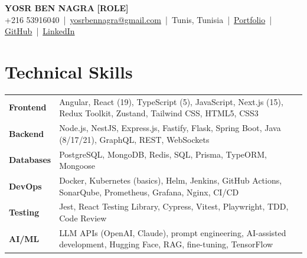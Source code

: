 \documentclass[10pt,a4paper]{article}
\newcommand{\skillrow}[2]{\textbf{#1} & #2 \\}
\begin{document}
{\huge\bfseries YOSR BEN NAGRA} \hfill {\large\color{teal}\bfseries [ROLE]}\\[3pt]
{\small\color{gray}
  +216 53916040 \,|\, \href{mailto:yosrbennagra@gmail.com}{yosrbennagra@gmail.com} \,|\, Tunis, Tunisia \,|\,
  \href{https://portfolio-yosr.vercel.app/en}{Portfolio} \,|\,
  \href{https://github.com/YosrBennagra}{GitHub} \,|\,
  \href{https://www.linkedin.com/in/yosr-ben-nagra/}{LinkedIn}
}

\section*{Technical Skills}
{\small
\begin{tabular}{@{}p{}p{}@{}}
\skillrow{Frontend}{Angular, React (19), TypeScript (5), JavaScript, Next.js (15), Redux Toolkit, Zustand, Tailwind CSS, HTML5, CSS3}
\skillrow{Backend}{Node.js, NestJS, Express.js, Fastify, Flask, Spring Boot, Java (8/17/21), GraphQL, REST, WebSockets}
\skillrow{Databases}{PostgreSQL, MongoDB, Redis, SQL, Prisma, TypeORM, Mongoose}
\skillrow{DevOps}{Docker, Kubernetes (basics), Helm, Jenkins, GitHub Actions, SonarQube, Prometheus, Grafana, Nginx, CI/CD}
\skillrow{Testing}{Jest, React Testing Library, Cypress, Vitest, Playwright, TDD, Code Review}
\skillrow{AI/ML}{LLM APIs (OpenAI, Claude), prompt engineering, AI-assisted development, Hugging Face, RAG, fine-tuning, TensorFlow}
\end{tabular}
}

\end{document}
